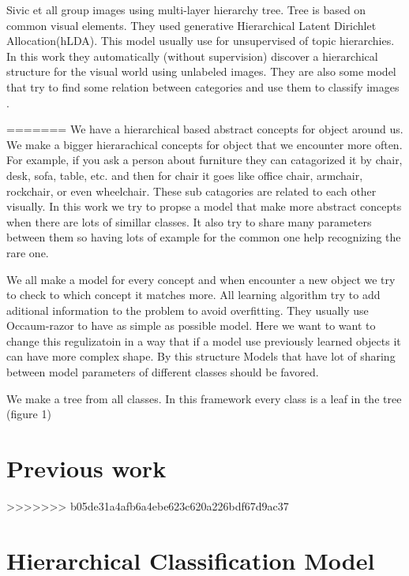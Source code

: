 \documentclass[10pt,twocolumn,letterpaper]{article}
\begin{document}
Sivic et all \cite{sivic} group images using multi-layer hierarchy tree. Tree is based on common visual elements. They used generative Hierarchical Latent Dirichlet Allocation(hLDA). This model usually use for unsupervised of topic hierarchies. In this work they automatically (without supervision) discover a hierarchical structure for the visual world using unlabeled images. They are also some model that try to find some relation between categories and use them to classify images \cite{transfer22}.

=======
We have a hierarchical based abstract concepts for object around us. We make a bigger hierarachical concepts for object that we encounter more often. For example, if you ask a person about furniture they can catagorized it by chair, desk, sofa, table, etc. and then for chair it goes like office chair, armchair, rockchair, or even wheelchair. These sub catagories are related to each other visually. In this work we try to propse a model that make more abstract concepts when there are lots of simillar classes. It also try to share many parameters between them so having lots of example for the common one help recognizing the rare one.

We all make a model for every concept and when encounter a new object we try to check to which concept it matches more. All learning algorithm try to add aditional information to the problem to avoid overfitting. They usually use Occaum-razor to have as simple as possible model. Here we want to want to change this regulizatoin in a way that if a model use previously learned objects it can have more complex shape. By this structure Models that have lot of sharing between model parameters of different classes should be favored.

We make a tree from all classes. In this framework every class is a leaf in the tree (figure 1) 

\section{Previous work}
>>>>>>> b05de31a4afb6a4ebe623c620a226bdf67d9ac37


\section{Hierarchical Classification Model}
\end{document}
